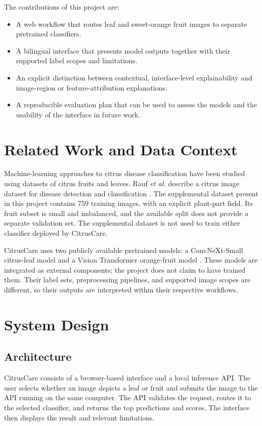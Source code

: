 \documentclass[conference]{IEEEtran}
\begin{document}
The contributions of this project are:
\begin{itemize}
  \item A web workflow that routes leaf and sweet-orange fruit images to separate pretrained classifiers.
  \item A bilingual interface that presents model outputs together with their supported label scopes and limitations.
  \item An explicit distinction between contextual, interface-level explainability and image-region or feature-attribution explanations.
  \item A reproducible evaluation plan that can be used to assess the models and the usability of the interface in future work.
\end{itemize}

\section{Related Work and Data Context}
Machine-learning approaches to citrus disease classification have been studied using datasets of citrus fruits and leaves. Rauf \emph{et al.} describe a citrus image dataset for disease detection and classification \cite{rauf2019}. The supplemental dataset present in this project contains 759 training images, with an explicit plant-part field. Its fruit subset is small and imbalanced, and the available split does not provide a separate validation set. The supplemental dataset is not used to train either classifier deployed by CitrusCare.

CitrusCare uses two publicly available pretrained models: a ConvNeXt-Small citrus-leaf model \cite{ixrmodel} and a Vision Transformer orange-fruit model \cite{dima806model}. These models are integrated as external components; the project does not claim to have trained them. Their label sets, preprocessing pipelines, and supported image scopes are different, so their outputs are interpreted within their respective workflows.

\section{System Design}
\subsection{Architecture}
CitrusCare consists of a browser-based interface and a local inference API. The user selects whether an image depicts a leaf or fruit and submits the image to the API running on the same computer. The API validates the request, routes it to the selected classifier, and returns the top predictions and scores. The interface then displays the result and relevant limitations.
\end{document}
